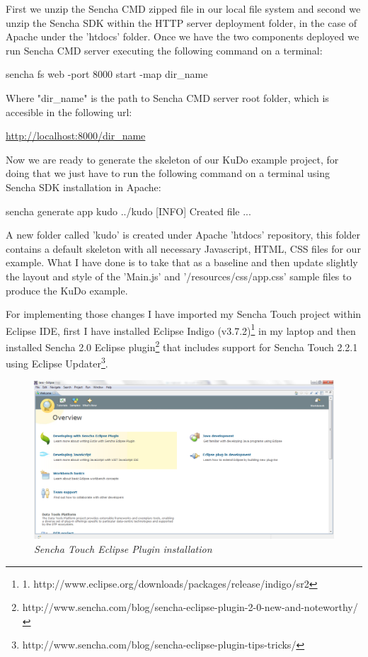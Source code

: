 \documentclass[a4paper,12pt]{book}
\begin{document}
First we unzip the Sencha CMD zipped file in our local file system and second we unzip the Sencha SDK within the HTTP server deployment folder, in the case of Apache under the 'htdocs' folder. Once we have the two components deployed we run Sencha CMD server executing the following command on a terminal:

\begin{code}
sencha fs web -port 8000 start -map dir_name
\end{code}

Where "dir\_name" is the path to Sencha CMD server root folder, which is accesible in the following url:

\url{http://localhost:8000/dir\_name}

Now we are ready to generate the skeleton of our KuDo example project, for doing that we just have to run the following command on a terminal using Sencha SDK installation in Apache:

\begin{code}
sencha generate app kudo ../kudo
[INFO] Created file ...
\end{code}

A new folder called 'kudo' is created under Apache 'htdocs' repository, this folder contains a default skeleton with all necessary Javascript, HTML, CSS files for our example. What I have done is to take that as a baseline and then update slightly the layout and style of the 'Main.js' and '/resources/css/app.css' sample files to produce the KuDo example. 

For implementing those changes I have imported my Sencha Touch project within Eclipse IDE, first I have installed Eclipse Indigo (v3.7.2)\footnote{1. http://www.eclipse.org/downloads/packages/release/indigo/sr2} in my laptop and then installed Sencha 2.0 Eclipse plugin\footnote{http://www.sencha.com/blog/sencha-eclipse-plugin-2-0-new-and-noteworthy/} that includes support for Sencha Touch 2.2.1 using Eclipse Updater\footnote{http://www.sencha.com/blog/sencha-eclipse-plugin-tips-tricks/}. 

\begin{figure}[H]
    \centering
    \includegraphics[width=12cm, keepaspectratio]{img/sencha2.png}
    \caption{\textit{Sencha Touch Eclipse Plugin installation}}
 \end{figure}
\end{document}
